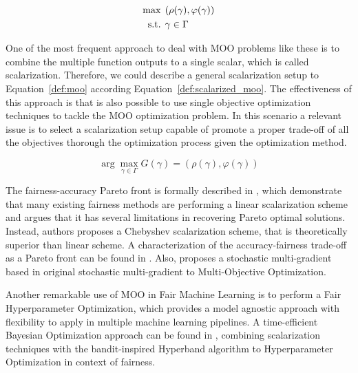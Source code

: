 \begin{align}\label{def:moo}
\max &\hspace{1ex} (\rho(\gamma), \varphi(\gamma)) \\
\text{s.t.} &\hspace{1ex} \gamma\in\Gamma \nonumber
\end{align}

One of the most frequent approach to deal with MOO problems like these is to combine the multiple function outputs to a single scalar, which is called scalarization. Therefore, we could describe a general scalarization setup to Equation~\ref{def:moo} according Equation~\ref{def:scalarized_moo}. The effectiveness of this approach is that is also possible to use single objective optimization techniques to tackle the MOO optimization problem. In this scenario a relevant issue is to select a scalarization setup capable of promote a proper trade-off of all the objectives thorough the optimization process given the optimization method.

\begin{equation}\label{def:scalarized_moo}
\arg\max\limits_{\gamma\in\Gamma} G(\gamma) = (\rho(\gamma), \varphi(\gamma))
\end{equation}

The fairness-accuracy Pareto front is formally described in \cite{Wei2022}, which demonstrate that many existing fairness methods are performing a linear scalarization scheme and argues that it has several limitations in recovering Pareto optimal solutions. Instead, authors proposes a Chebyshev scalarization scheme, that is theoretically superior than linear scheme. A characterization of the accuracy-fairness trade-off as a Pareto front can be found in \cite{Liu2022}. Also, \cite{Mercier2018} proposes a stochastic multi-gradient based in original stochastic multi-gradient to Multi-Objective Optimization.

Another remarkable use of MOO in Fair Machine Learning is to perform a Fair Hyperparameter Optimization, which provides a model agnostic approach with flexibility to apply in multiple machine learning pipelines. A time-efficient Bayesian Optimization approach can be found in \cite{Schmucker2020}, combining scalarization techniques with the bandit-inspired Hyperband \citep{Li2016} algorithm to Hyperparameter Optimization in context of fairness.

